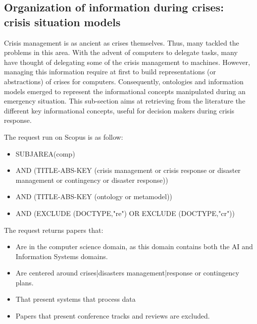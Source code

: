 \subsection{Organization of information during crises: crisis situation models}
Crisis management is as ancient as crises themselves.
Thus, many tackled the problems in this area.
With the advent of computers to delegate tasks, many have thought of delegating some of the crisis management to machines.
However, managing this information require at first to build representations (or abstractions) of crises for computers.
Consequently, ontologies and information models emerged to represent the informational concepts manipulated during an emergency situation.
This sub-section aims at retrieving from the literature the different key informational concepts, useful for decision makers during crisis response.

The request run on Scopus is as follow:
\begin{itemize}
    \item SUBJAREA(comp)
    \item AND (TITLE-ABS-KEY ({crisis management} or {crisis response} or {disaster management} or contingency or {disaster response}))
    \item AND (TITLE-ABS-KEY (ontology or metamodel))
    \item AND (EXCLUDE (DOCTYPE,"re") OR EXCLUDE (DOCTYPE,"cr"))
\end{itemize}

The request returns papers that:
\begin{itemize}
    \item Are in the computer science domain, as this domain contains both the AI and Information Systems domains.
    \item Are centered around crises|disasters management|response or contingency plans.
    \item That present systems that process data
    \item Papers that present conference tracks and reviews are excluded.
\end{itemize}


